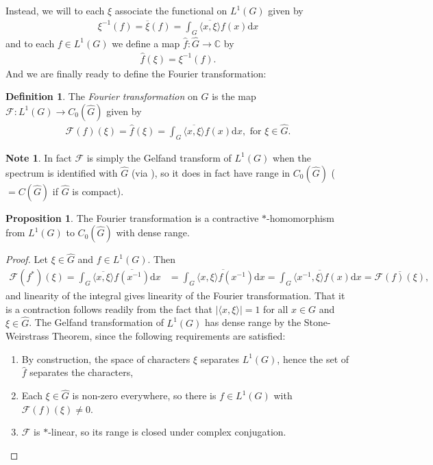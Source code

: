 \documentclass[10pt,twoside,openany,final]{memoir}
\theoremstyle{definition}
\newtheorem{proposition}[theorem]{Proposition}
\newtheorem{definition}[theorem]{Definition}
\theoremstyle{Break}
\newtheorem*{note}{Note}
\newcommand{\C}{\mathbb{C}}
\newcommand{\F}{\mathcal{F}}
\newcommand{\G}{\widehat{G}}
\renewcommand{\d}{\mathrm{d}}
\begin{document}
Instead, we will to each $\xi$ associate the functional on $L^1(G)$ given by 
\begin{align}
	\xi^{-1}(f)=\overline{\xi}(f)=\int_G \overline{\langle x , \xi \rangle} f(x) \d x
	\label{modified}
\end{align}
and to each $f \in L^1(G)$ we define a map $\widehat{f} \colon \widehat{G} \to \C$ by
\begin{align*}
	\widehat{f}(\xi)=\xi^{-1}(f).
\end{align*}
And we are finally ready to define the Fourier transformation:
\begin{definition}
	The \emph{Fourier transformation} on $G$ is the map $\mathcal{F} \colon L^1(G) \to C_0(\widehat{G})$ given by
	\begin{align*}
		\mathcal{F}(f)(\xi)=\widehat{f}(\xi)=\int_G \overline{\langle x, \xi \rangle} f(x) \d x, \text{ for } \xi \in \widehat{G}.
	\end{align*}
\end{definition}
\begin{note}
	In fact $\mathcal{F}$ is simply the Gelfand transform of $L^1(G)$ when the spectrum is identified with $\widehat{G}$ (via ), so it does in fact have range in $C_0(\widehat{G})$ ($=C(\widehat{G})$ if $\widehat{G}$ is compact).
\end{note}
\begin{proposition}
	The Fourier transformation is a contractive $*$-homomorphism from $L^1(G)$ to $C_0(\widehat{G})$ with dense range.
	\label{4.13}
\end{proposition}
\begin{proof}
	Let $\xi \in \widehat{G}$ and $f \in L^1(G)$. Then
	\begin{align*}
		\F(f^*)(\xi)=\int_{G} \overline{\langle x,\xi\rangle} \overline{f(x^{-1})} \d x &= \overline{\int_G \langle x,\xi \rangle f(x^{-1})\d x}= \overline{\int_G \langle x^{-1}, \xi \rangle f(x) \d x }= \overline{\F(f) (\xi)},
	\end{align*}
	and linearity of the integral gives linearity of the Fourier transformation. That it is a contraction follows readily from the fact that $|\langle x,\xi \rangle| =1$ for all $x \in G$ and $\xi \in \G$.
The Gelfand transformation of $L^1(G)$ has dense range by the Stone-Weirstrass Theorem, since the following requirements are satisfied:
	\begin{enumerate}
		\item By construction, the space of characters $\xi$ separates $L^1(G)$, hence the set of $\widehat{f}$ separates the characters,
		\item Each $\xi \in \G$ is non-zero everywhere, so there is $f \in L^1(G)$ with $\F(f)(\xi)\neq0$.
		\item $\F$ is $*$-linear, so its range is closed under complex conjugation.
	\end{enumerate}
\end{proof}
\end{document}

